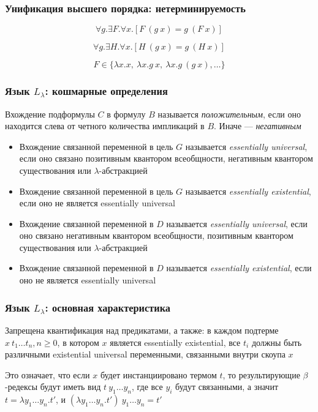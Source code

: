 \documentclass{beamer}
\begin{document}
\begin{frame}[fragile]
  \frametitle{Унификация высшего порядка: нетерминируемость}
\[ \forall g. \exists F. \forall x. [F \ (g \ x) = g \ (F \ x) ]\]

\[ \forall g. \exists H. \forall x. [H \ (g \ x) = g \ (H \ x) ]\]

\[ F \in \{ \lambda x. x, \ \lambda x. g \ x, \ \lambda x. g \ (g \ x), \dots\}\]
\end{frame}

\begin{frame}[fragile]
  \frametitle{Язык $L_{\lambda}$: кошмарные определения}
Вхождение подформулы $C$ в формулу $B$ называется \textit{положительным}, если оно находится слева от четного количества импликаций в $B$. Иначе --- \textit{негативным}

\begin{itemize}
  \item Вхождение связанной переменной в цель $G$ называется \textit{essentially universal}, если оно связано позитивным квантором всеобщности, негативным квантором существования или $\lambda$-абстракцией
  \item Вхождение связанной переменной в цель $G$ называется \textit{essentially existential}, если оно не является essentially universal
  \item Вхождение связанной переменной в $D$ называется \textit{essentially universal}, если оно связано негативным квантором всеобщности, позитивным квантором существования или $\lambda$-абстракцией
  \item Вхождение связанной переменной в $D$ называется \textit{essentially existential}, если оно не является essentially universal
\end{itemize}
\end{frame}

\begin{frame}[fragile]
  \frametitle{Язык $L_{\lambda}$: основная характеристика}

Запрещена квантификация над предикатами, а также:
в каждом подтерме $x \ t_1 \dots t_n, n \geq 0$, в котором $x$ является essentially existential, все $t_i$ должны быть различными existential universal переменными, связанными внутри скоупа $x$

\vspace{1cm}

Это означает, что если $x$ будет инстанциировано термом $t$, то результирующие $\beta$-редексы будут иметь вид $t \ y_1 \dots y_n$, где все $y_i$ будут связанными, а значит $t = \lambda y_1 \dots y_n. t'$, и $(\lambda y_1 \dots y_n. t') \ y_1  \dots y_n = t'$
\end{frame}
\end{document}
